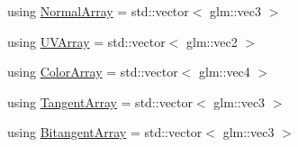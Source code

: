 \begin{DoxyCompactItemize}
using \hyperlink{class_rendering_object_a327c4d892de8d6138fb59afa6d078257}{Normal\+Array} = std\+::vector$<$ glm\+::vec3 $>$
\item
using \hyperlink{class_rendering_object_a504ecd45ebe36dfa5b78c46d64d9904a}{U\+V\+Array} = std\+::vector$<$ glm\+::vec2 $>$
\item
using \hyperlink{class_rendering_object_a8a12e1f9be788d99af6c089e1c600022}{Color\+Array} = std\+::vector$<$ glm\+::vec4 $>$
\item
using \hyperlink{class_rendering_object_a45b53e911c2f0131aa10e89869d38944}{Tangent\+Array} = std\+::vector$<$ glm\+::vec3 $>$
\item
using \hyperlink{class_rendering_object_a6c6bf305a5f0f9ce1006f374c753c856}{Bitangent\+Array} = std\+::vector$<$ glm\+::vec3 $>$
\end{DoxyCompactItemize}
